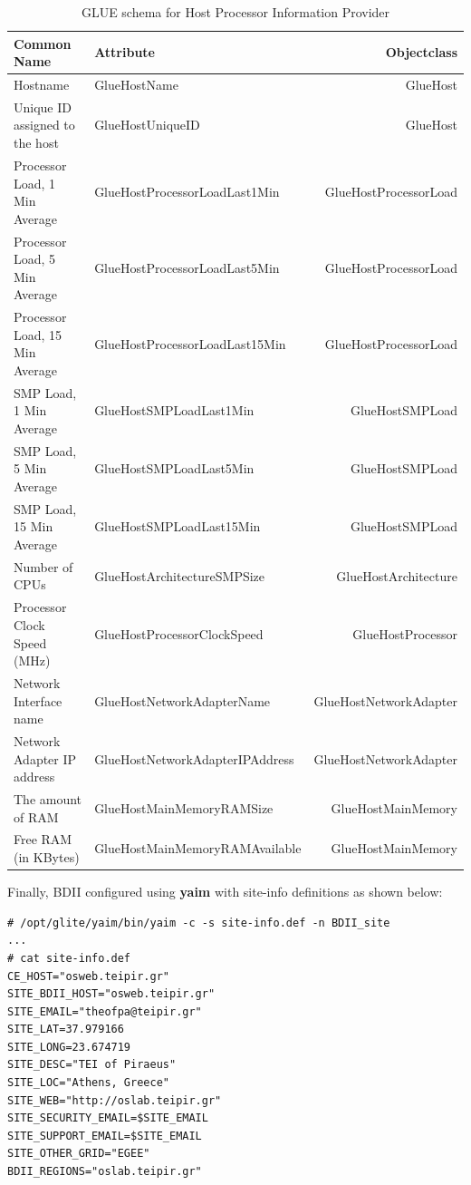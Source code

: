 \begin{table}[ht]
\small\addtolength{\tabcolsep}{-3pt}
\begin{tabular}{ | l | l | r |}
\hline
{\bf Common Name} & {\bf Attribute} & {\bf Objectclass} \\ \hline
Hostname & GlueHostName & GlueHost \\ \hline
Unique ID assigned to the host & GlueHostUniqueID & GlueHost  \\ \hline
Processor Load, 1 Min Average  & GlueHostProcessorLoadLast1Min & GlueHostProcessorLoad \\ \hline
Processor Load, 5 Min Average  & GlueHostProcessorLoadLast5Min & GlueHostProcessorLoad \\ \hline
Processor Load, 15 Min Average  & GlueHostProcessorLoadLast15Min & GlueHostProcessorLoad \\ \hline
SMP Load, 1 Min Average  & GlueHostSMPLoadLast1Min & GlueHostSMPLoad \\ \hline
SMP Load, 5 Min Average  & GlueHostSMPLoadLast5Min & GlueHostSMPLoad \\ \hline
SMP Load, 15 Min Average  & GlueHostSMPLoadLast15Min & GlueHostSMPLoad \\ \hline
Number of CPUs  & GlueHostArchitectureSMPSize & GlueHostArchitecture \\ \hline
Processor Clock Speed (MHz)  & GlueHostProcessorClockSpeed & GlueHostProcessor \\ \hline
Network Interface name  & GlueHostNetworkAdapterName & GlueHostNetworkAdapter \\ \hline
Network Adapter IP address  & GlueHostNetworkAdapterIPAddress & GlueHostNetworkAdapter \\ \hline
The amount of RAM  & GlueHostMainMemoryRAMSize & GlueHostMainMemory \\ \hline
Free RAM (in KBytes)  & GlueHostMainMemoryRAMAvailable & GlueHostMainMemory \\ \hline
\end{tabular}
\caption{GLUE schema for Host Processor Information Provider}
\label{tab:glue}
\end{table}

Finally, BDII configured using {\bf yaim} with site-info definitions as shown below:

\begin{verbatim}
# /opt/glite/yaim/bin/yaim -c -s site-info.def -n BDII_site
...
# cat site-info.def
CE_HOST="osweb.teipir.gr"
SITE_BDII_HOST="osweb.teipir.gr"
SITE_EMAIL="theofpa@teipir.gr"
SITE_LAT=37.979166
SITE_LONG=23.674719
SITE_DESC="TEI of Piraeus"
SITE_LOC="Athens, Greece"
SITE_WEB="http://oslab.teipir.gr"
SITE_SECURITY_EMAIL=$SITE_EMAIL
SITE_SUPPORT_EMAIL=$SITE_EMAIL
SITE_OTHER_GRID="EGEE"
BDII_REGIONS="oslab.teipir.gr"
\end{verbatim}

